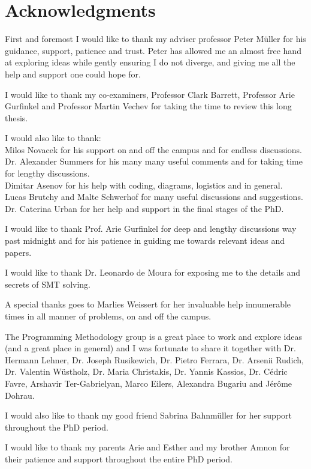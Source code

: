 \chapter*{Acknowledgments}

First and foremost I would like to thank my adviser professor Peter M{\"u}ller for his guidance, support, patience and trust. Peter has allowed me an almost free hand at exploring ideas while gently ensuring I do not diverge, and giving me all the help and support one could hope for.

I would like to thank my co-examiners, Professor Clark Barrett, Professor Arie Gurfinkel and Professor Martin Vechev for taking the time to review this long thesis.

I would also like to thank:\\
Milos Novacek for his support on and off the campus and for endless discussions.\\
Dr. Alexander Summers for his many many useful comments and for taking time for lengthy discussions.\\
Dimitar Asenov for his help with coding, diagrams, logistics and in general.\\
Lucas Brutchy and Malte Schwerhof for many useful discussions and suggestions.\\
Dr. Caterina Urban for her help and support in the final stages of the PhD.

I would like to thank Prof. Arie Gurfinkel for deep and lengthy discussions way past midnight and for his patience in guiding me towards relevant ideas and papers.

I would like to thank Dr. Leonardo de Moura for exposing me to the details and secrets of SMT solving.

A special thanks goes to Marlies Weissert for her invaluable help innumerable times in all manner of problems, on and off the campus.

The Programming Methodology group is a great place to work and explore ideas (and a great place in general) and I was fortunate to share it together with Dr. Hermann Lehner, Dr. Joseph Rusikewich, Dr. Pietro Ferrara, Dr. Arsenii Rudich, Dr. Valentin W{\"u}stholz, Dr. Maria Christakis, Dr. Yannis Kassios, Dr. C\'{e}dric Favre, Arshavir Ter-Gabrielyan, Marco Eilers, Alexandra Bugariu and J\'{e}r\^{o}me Dohrau.

I would also like to thank my good friend Sabrina Bahnm{\"u}ller for her support throughout the PhD period.

I would like to thank my parents Arie and Esther and my brother Amnon for their patience and support throughout the entire PhD period.




\newpage
